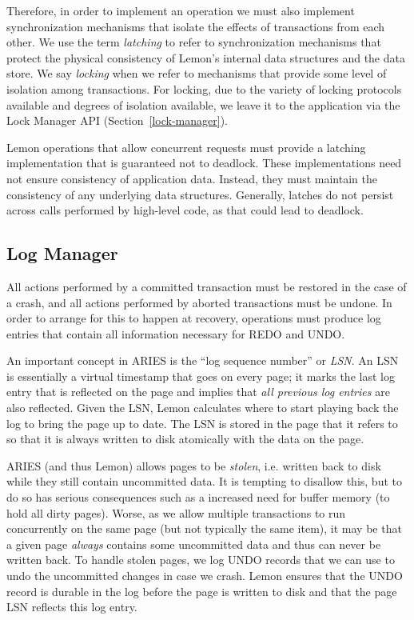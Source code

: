 \documentclass[10pt,letterpaper,twocolumn,english]{article}
\newcommand{\yad}{Lemon\xspace}
\begin{document}
Therefore, in order to implement an operation we must also implement
synchronization mechanisms that isolate the effects of transactions
from each other.  We use the term {\em latching} to refer to
synchronization mechanisms that protect the physical consistency of
\yad's internal data structures and the data store.  We say {\em
locking} when we refer to mechanisms that provide some level of
isolation among transactions.  
For locking, due to the variety of locking protocols available and degrees of isolation available, we leave it to the application via the Lock Manager API (Section~\ref{lock-manager}).


\yad operations that allow concurrent requests must provide a latching
implementation that is guaranteed not to deadlock.
These implementations need not ensure consistency of application data.
Instead, they must maintain the consistency of any underlying data
structures.  Generally, latches do not persist across calls performed
by high-level code, as that could lead to deadlock.





\subsection{Log Manager}
\label{log-manager}

All actions performed by a committed transaction must be
restored in the case of a crash, and all actions performed by aborted
transactions must be undone. In order to arrange for this
to happen at recovery, operations must produce log entries that contain
all information necessary for REDO and UNDO.

An important concept in ARIES is the ``log sequence number'' or {\em
LSN}.  An LSN is essentially a virtual timestamp that goes on every
page; it marks the last log entry that is reflected on the page and
implies that {\em all previous log entries} are also reflected.  Given the
LSN, \yad calculates where to start playing back the log to bring the
page up to date.  The LSN is stored in the page that it refers to so
that it is always written to disk atomically with the data on the
page.

ARIES (and thus \yad) allows pages to be {\em stolen}, i.e. written
back to disk while they still contain uncommitted data.  It is
tempting to disallow this, but to do so has serious consequences such as
a increased need for buffer memory (to hold all dirty pages). Worse,
as we allow multiple transactions to run concurrently on the same page
(but not typically the same item), it may be that a given page {\em
always} contains some uncommitted data and thus can never be written
back.  To handle stolen pages, we log UNDO records that
we can use to undo the uncommitted changes in case we crash.  \yad
ensures that the UNDO record is durable in the log before the
page is written to disk and that the page LSN reflects this log entry.
\end{document}
